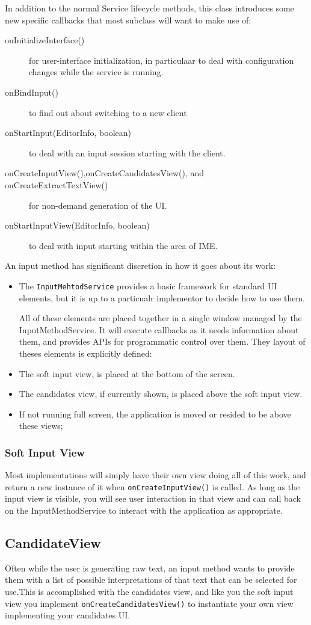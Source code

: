 \documentclass[11pt, a4paper]{book}
\begin{document}
In addition to the normal Service lifecycle methods, this class introduces some
new specific callbacks that most subclass will want to make use of:
\begin{description}
\item [onInitializeInterface()] for user-interface initialization, in
particulaar to deal with configuration changes while the service is running.
\item [onBindInput()] to find out about switching to a new client
\item [onStartInput(EditorInfo, boolean)] to deal with an input session starting
with the client.
\item [onCreateInputView(),onCreateCandidatesView(), and
onCreateExtractTextView()] for non-demand generation of the UI.
\item [onStartInputView(EditorInfo, boolean)] to deal with input starting within
the area of IME.
\end{description}
An input method has significant discretion in how it goes about its work:
\begin{itemize}
\item The \verb|InputMehtodService| provides a basic framework for standard UI
elements, but it is up to a particualr implementor to decide how to use them.

All of these elements are placed together in a single window managed by the
InputMethodService. It will execute callbacks as it needs information about
them, and provides APIs for programmatic control over them. They layout of theses
elements is explicitly defined:
\item The soft input view, is placed at the bottom of the screen.
\item The candidates view, if currently shown, is placed above the soft input
view.
\item If not running full screen, the application is moved or resided to be
above these views;
\end{itemize}
\subsubsection{Soft Input View}
Most implementations will simply have their own view doing all of this work, and
return a new instance of it when \verb|onCreateInputView()| is called. As long
as the input view is visible, you will see user interaction in that view and can
call back on the InputMethodService to interact with the application as
appropriate.
\subsection{CandidateView}
Often while the user is generating raw text, an input method wants to provide
them with a list of possible interpretations of that text that can be selected
for use.This is accomplished with the candidates view, and like you the soft
input view you implement \verb|onCreateCandidatesView()| to instantiate your own
view implementing your candidates UI.
\end{document}
